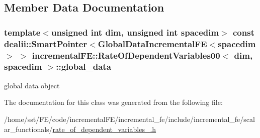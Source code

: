 \subsection{Member Data Documentation}
\subsubsection[{\texorpdfstring{global\+\_\+data}{global_data}}]{\setlength{\rightskip}{0pt plus 5cm}template$<$unsigned int dim, unsigned int spacedim$>$ const dealii\+::\+Smart\+Pointer$<${\bf Global\+Data\+Incremental\+FE}$<$spacedim$>$ $>$ {\bf incremental\+F\+E\+::\+Rate\+Of\+Dependent\+Variables00}$<$ dim, spacedim $>$\+::global\+\_\+data\hspace{0.3cm}{\ttfamily [private]}}\hypertarget{classincremental_f_e_1_1_rate_of_dependent_variables00_a0ae0d07da073985a32f9fc812d13a066}{}\label{classincremental_f_e_1_1_rate_of_dependent_variables00_a0ae0d07da073985a32f9fc812d13a066}
global data object 

The documentation for this class was generated from the following file\+:\begin{DoxyCompactItemize}
\item 
/home/sst/\+F\+E/code/incremental\+F\+E/incremental\+\_\+fe/include/incremental\+\_\+fe/scalar\+\_\+functionals/\hyperlink{rate__of__dependent__variables__00_8h}{rate\+\_\+of\+\_\+dependent\+\_\+variables\+\_.\+h}\end{DoxyCompactItemize}
